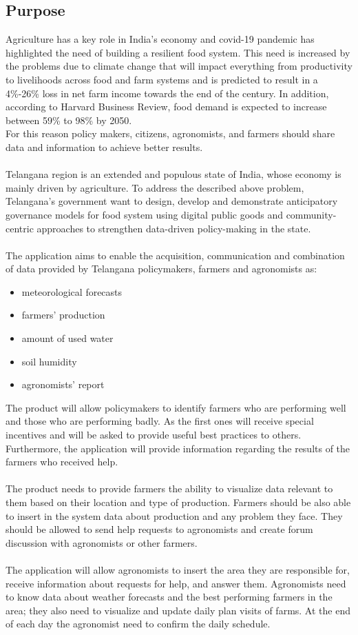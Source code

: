 \subsection{Purpose} 
Agriculture has a key role in India's economy and covid-19 pandemic has highlighted the need of building a resilient food system.
This need is increased by the problems due to climate change that will impact everything from productivity to 
livelihoods across food and farm systems and is predicted to result in a 4\%-26\% loss in net farm income towards the end of the century.
In addition, according to Harvard Business Review, food demand is expected to increase between 59\% to 98\% by 2050.\\
For this reason policy makers, citizens, agronomists, and farmers should share data and information to achieve better results. 
\\\\
Telangana region is an extended and populous state of India, whose economy is mainly driven by agriculture. 
To address the described above problem, Telangana's government want to design, 
develop and demonstrate anticipatory governance models for food system using digital 
public goods and community-centric approaches to strengthen data-driven policy-making in the state.
\\\\
The application aims to enable the acquisition, communication and combination of data provided by Telangana policymakers, 
farmers and agronomists as:
\begin{itemize}
    \item meteorological forecasts
    \item farmers' production
    \item amount of used water
    \item soil humidity
    \item agronomists' report
\end{itemize}
\bigskip
The product will allow policymakers to identify farmers who are performing well and those who are performing badly. 
As the first ones will receive special incentives and will be asked to provide useful best practices to others. 
Furthermore, the application will provide information regarding the results of the farmers who received help.
\\\\
The product needs to provide farmers the ability to visualize data relevant to them based on their location and type of production. 
Farmers should be also able to insert in the system data about production and any problem they face. 
They should be allowed to send help requests to agronomists and create forum discussion with agronomists or other farmers.
\\\\
The application will allow agronomists to insert the area they are responsible for, receive information about requests for help, 
and answer them. Agronomists need to know data about weather forecasts and the best performing farmers in the area; 
they also need to visualize and update daily plan visits of farms. At the end of each day the agronomist need to confirm the daily
schedule.


